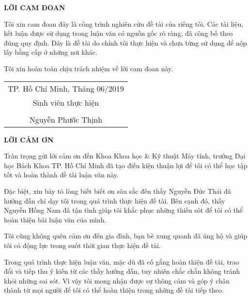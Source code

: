 \begin{center}
    \Large{\textbf{LỜI CAM ĐOAN}}
\end{center}
\vspace{10mm}
\par
Tôi xin cam đoan đây là công trình nghiên cứu đề tài của riêng tôi. Các tài liệu, kết luận được sử dụng trong luận văn có nguồn gốc rõ ràng, đã công bố theo đúng quy định. Đây là đề tài do chính tôi thực hiện và chưa từng sử dụng để nộp lấy bằng cấp ở những nơi khác.
\vspace{1em}
\par
Tôi xin hoàn toàn chịu trách nhiệm về lời cam đoan này.
\vspace{10mm}
\begin{table}[!ht]
    \raggedleft
    \begin{tabular}{c}
        TP. Hồ Chí Minh, Tháng 06/2019\\
        Sinh viên thực hiện\\
        \vspace{5mm}\\
        Nguyễn Phước Thịnh\\
    \end{tabular}
\end{table}
\thispagestyle{empty}
\cleardoublepage
\begin{center}
    \Large{\textbf{LỜI CẢM ƠN}}
\end{center}
\vspace{10mm}
\par
Trân trọng gửi lời cảm ơn đến Khoa Khoa học \& Kỹ thuật Máy tính, trường Đại học Bách Khoa TP. Hồ Chí Minh đã tạo điều kiện thuận lợi để tôi có thể học tập tốt và hoàn thành đề tài luận văn này.
\vspace{1em}
\par
Đặc biệt, xin bày tỏ lòng biết biết ơn sâu sắc đến thầy Nguyễn Đức Thái đã hướng dẫn chỉ dạy tôi trong quá trình thực hiện đề tài. Bên cạnh đó, thầy Nguyễn Hồng Nam đã tận tình giúp tôi khắc phục những thiếu sót để tôi có thể hoàn thiện bài luận văn của mình.
\vspace{1em}
\par
Tôi cũng không quên cảm ơn đến gia đình, bạn bè xung quanh đã ủng hộ và giúp tôi có động lực trong suốt thời gian thực hiện đề tài.
\vspace{1em}
\par
Trong quá trình thực hiện luận văn, mặc dù đã cố gắng hoàn thiện đề tài, trao đổi và tiếp thu ý kiến từ các thầy hướng dẫn, tuy nhiên chắc chắn không tránh khỏi những sai sót. Vì vậy tôi mong nhận được sự thông cảm và góp ý chân thành từ mọi người để tôi có thể hoàn thiện trong những đề tài tiếp theo.
